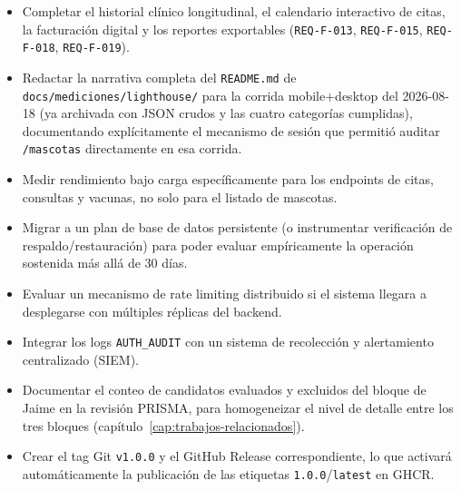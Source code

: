 \begin{itemize}[nosep]
  \item Completar el historial cl\'inico longitudinal, el calendario
    interactivo de citas, la facturaci\'on digital y los reportes
    exportables (\texttt{REQ-F-013}, \texttt{REQ-F-015}, \texttt{REQ-F-018},
    \texttt{REQ-F-019}).
  \item Redactar la narrativa completa del \texttt{README.md} de
    \texttt{docs/mediciones/lighthouse/} para la corrida mobile+desktop del
    2026-08-18 (ya archivada con JSON crudos y las cuatro categor\'ias
    cumplidas), documentando expl\'icitamente el mecanismo de sesi\'on que
    permiti\'o auditar \texttt{/mascotas} directamente en esa corrida.
  \item Medir rendimiento bajo carga espec\'ificamente para los endpoints
    de citas, consultas y vacunas, no solo para el listado de mascotas.
  \item Migrar a un plan de base de datos persistente (o instrumentar
    verificaci\'on de respaldo/restauraci\'on) para poder evaluar
    emp\'iricamente la operaci\'on sostenida m\'as all\'a de 30 d\'ias.
  \item Evaluar un mecanismo de rate limiting distribuido si el sistema
    llegara a desplegarse con m\'ultiples r\'eplicas del backend.
  \item Integrar los logs \texttt{AUTH\_AUDIT} con un sistema de
    recolecci\'on y alertamiento centralizado (SIEM).
  \item Documentar el conteo de candidatos evaluados y excluidos del
    bloque de Jaime en la revisi\'on PRISMA, para homogeneizar el nivel de
    detalle entre los tres bloques (cap\'itulo~\ref{cap:trabajos-relacionados}).
  \item Crear el tag Git \texttt{v1.0.0} y el GitHub Release
    correspondiente, lo que activar\'a autom\'aticamente la publicaci\'on
    de las etiquetas \texttt{1.0.0}/\texttt{latest} en GHCR.
\end{itemize}
